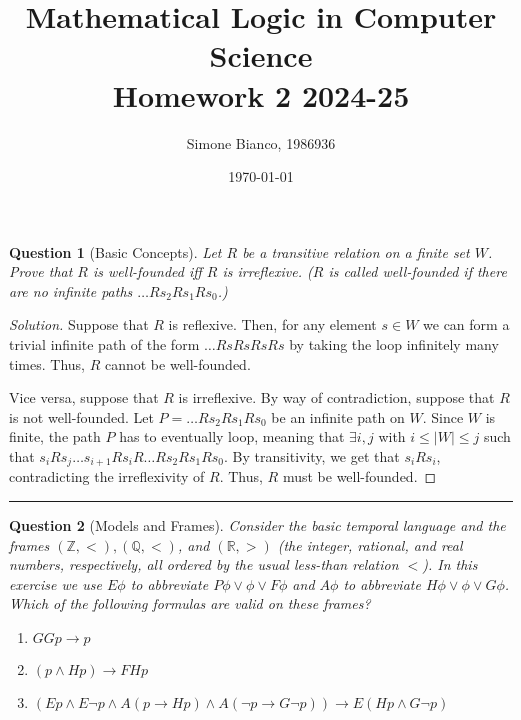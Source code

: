 \documentclass[12pt,a4paper]{report}
\newtheorem{question}{Question}
\theoremstyle{definition}
\newcommand{\abs}[1]{\left|#1\right|}
\newcommand{\Z}{\mathbb{Z}}                     %
\newcommand{\Q}{\mathbb{Q}}                     %
\newcommand{\R}{\mathbb{R}}                     %
\begin{document}
    \setlength{\parskip}{5pt}               %
    \setlength{\parindent}{0pt}             %

    \title{Mathematical Logic in Computer Science \\ Homework 2 2024-25}
    \author{Simone Bianco, 1986936}
    \date{\today}

    \maketitle

    \begin{question}[Basic Concepts]
        Let $R$ be a transitive relation on a finite set $W$. Prove that $R$ is well-founded iff $R$ is irreflexive. ($R$ is called well-founded if there are no infinite paths $\ldots Rs_2Rs_1Rs_0$.)
    \end{question}

    \begin{proof}[Solution]
        Suppose that $R$ is reflexive. Then, for any element $s \in W$ we can form a trivial infinite path of the form $\ldots Rs R s R s R s$ by taking the loop infinitely many times. Thus, $R$ cannot be well-founded.

        Vice versa, suppose that $R$ is irreflexive. By way of contradiction, suppose that $R$ is not well-founded. Let $P = \ldots Rs_2Rs_1Rs_0$ be an infinite path on $W$. Since $W$ is finite, the path $P$ has to eventually loop, meaning that $\exists i,j$ with $i \leq \abs{W} \leq j$ such that $s_i R s_j \ldots s_{i+1}Rs_iR \ldots Rs_2Rs_1Rs_0$. By transitivity, we get that $s_i R s_i$, contradicting the irreflexivity of $R$. Thus, $R$ must be well-founded.
    \end{proof}

    \quad

    \hrule

    \quad

    \begin{question}[Models and Frames]
        Consider the basic temporal language and the frames $(\Z, <), (\Q, <)$, and $(\R, >)$ (the integer, rational, and real numbers, respectively, all ordered by the usual less-than relation $<$). In this exercise we use $E\phi$ to abbreviate $P\phi \lor \phi \lor F \phi$ and $A \phi$ to abbreviate $H\phi \lor \phi \lor G \phi$. Which of the following formulas are valid on these frames?
        \begin{enumerate}
            \item $GGp \to p$
            \item $(p \land Hp) \to F Hp$
            \item $(Ep \land E \lnot p \land A(p \to Hp) \land A(\lnot p \to G \lnot p)) \to E(Hp \land G \lnot p)$
        \end{enumerate}
    \end{question}
\end{document}
